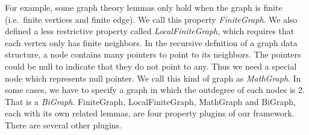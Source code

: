 For example, some graph theory lemmas only hold when the graph is
finite (i.e.\ finite vertices and finite edge). We call this
property \emph{FiniteGraph}. We also defined a less restrictive
property called \emph{LocalFiniteGraph}, which requires that each
vertex only has finite neighbors. In the recursive defnition of a
graph data structure, a node contains many pointers to point to its
neighbors. The pointers could be null to indicate that they do not
point to any. Thus we need a special node which represents null
pointer. We call this kind of graph as \emph{MathGraph}. In some
cases, we have to specify a graph in which the outdegree of each nodes
is 2. That is a \emph{BiGraph}. FiniteGraph, LocalFiniteGraph,
MathGraph and BiGraph, each with its own related lemmas, are four
property plugins of our framework. There are several other plugins.

